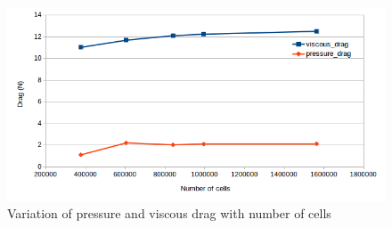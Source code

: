 \begin{figure}[H]
	\centering
	\includegraphics[width=300 pt]{surrogate_model_CFD_results/Grid_convergence.png}
	\caption{Variation of pressure and viscous drag with number of cells}
	\label{Grid convergence plot} %
\end{figure}


